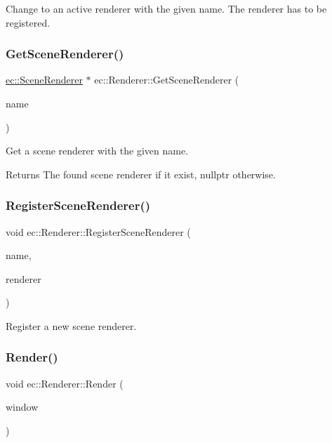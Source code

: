 Change to an active renderer with the given name. The renderer has to be registered. \mbox{\label{classec_1_1_renderer_adc19ec1ee2a41ac4229a75d18c0dc60a}} 
\subsubsection{\texorpdfstring{Get\+Scene\+Renderer()}{GetSceneRenderer()}}
{\footnotesize\ttfamily \mbox{\hyperlink{classec_1_1_scene_renderer}{ec\+::\+Scene\+Renderer}} $\ast$ ec\+::\+Renderer\+::\+Get\+Scene\+Renderer (\begin{DoxyParamCaption}\item[{const std\+::string \&}]{name }\end{DoxyParamCaption})}

Get a scene renderer with the given name. \begin{DoxyReturn}{Returns}
The found scene renderer if it exist, nullptr otherwise. 
\end{DoxyReturn}
\mbox{\label{classec_1_1_renderer_a74fb04d7d75703f5fe018a806fa82d0e}} 
\subsubsection{\texorpdfstring{Register\+Scene\+Renderer()}{RegisterSceneRenderer()}}
{\footnotesize\ttfamily void ec\+::\+Renderer\+::\+Register\+Scene\+Renderer (\begin{DoxyParamCaption}\item[{const std\+::string \&}]{name,  }\item[{\mbox{\hyperlink{classec_1_1_scene_renderer}{Scene\+Renderer}} $\ast$}]{renderer }\end{DoxyParamCaption})}

Register a new scene renderer. \mbox{\label{classec_1_1_renderer_afe11d20b1d49004bb01bb5db31845803}} 
\subsubsection{\texorpdfstring{Render()}{Render()}}
{\footnotesize\ttfamily void ec\+::\+Renderer\+::\+Render (\begin{DoxyParamCaption}\item[{\mbox{\hyperlink{classec_1_1_window}{Window}} $\ast$}]{window }\end{DoxyParamCaption})}

